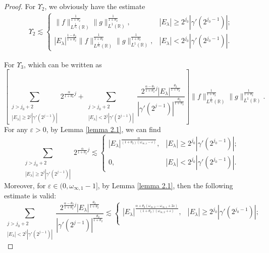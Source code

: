\documentclass[11pt, twoside, leqno]{article}
\theoremstyle{definition}
\numberwithin{equation}{section}
\begin{document}
\begin{proof}
For $\Upsilon_2$, we obviously have the estimate
\begin{align}\label{eq:5.4}
\Upsilon_{2}\lesssim
\begin{cases}
   \|f\|^{\frac{1}{1+\theta_2}}_{L^{\frac{1}{\theta_2}}(\mathbb{R})}\|g\|^{\frac{1}{1+\theta_2}}_{L^{1}(\mathbb{R})}, &  |E_{\lambda}|\geq2^{j_0}|\gamma'(2^{j_{0}-1})|; \\
  |E_\lambda|^{\frac{1-\theta_{2}}{1+\theta_{2}}}\|f\|^{\frac{1}{1+\theta_2}}_{L^{\frac{1}{\theta_2}}(\mathbb{R})}\|g\|^{\frac{1}{1+\theta_2}}_{L^{1}(\mathbb{R})}, & |E_{\lambda}|<2^{j_0}|\gamma'(2^{j_{0}-1})|.
 \end{cases}
  \end{align}

For $\Upsilon_3$, which can be written as
$$\left[\sum\limits_{  \substack{j>j_{0}+2   \\ |E_{\lambda}|\geq2^j{|\gamma'(2^{j-1})|} }} 2^{{\frac{\alpha}{1+\theta_{2}}}j}+
\sum\limits_{  \substack{j>j_{0}+2   \\ |E_{\lambda}|<2^j{|\gamma'(2^{j-1})|} }} \frac{2^{{\frac{\alpha-\theta_{2}}{1+\theta_{2}}}j}
|E_\lambda|^{\frac{\theta_{2}}{1+\theta_{2}}}}{|\gamma'(2^{j-1})|^{\frac{\theta_{2}}{1+\theta_{2}}}}\right]
\|f\|^{\frac{1}{1+\theta_2}}_{L^{\frac{1}{\theta_2}}(\mathbb{R})}\|g\|^{\frac{1}{1+\theta_2}}_{L^{1}(\mathbb{R})}.$$
For any $\varepsilon>0$, by Lemma \ref{lemma 2.1}, we can find
$$\sum\limits_{  \substack{j>j_{0}+2   \\ |E_{\lambda}|\geq2^j{|\gamma'(2^{j-1})|} }} 2^{{\frac{\alpha}{1+\theta_{2}}}j}\lesssim
\begin{cases}
  |E_\lambda|^{\frac{\alpha}{(1+\theta_{2})(\omega_{\infty,1}-\varepsilon)}}, & |E_\lambda|\geq2^{j_0}|\gamma'(2^{j_{0}-1})|;\\
  0, & |E_\lambda|<2^{j_0}|\gamma'(2^{j_{0}-1})|.
\end{cases}$$
Moreover, for $\varepsilon\in(0, \omega_{\infty,1}-1]$, by Lemma \ref{lemma 2.1}, then the following estimate is valid:
$$\sum\limits_{  \substack{j>j_{0}+2   \\ |E_{\lambda}|<2^j{|\gamma'(2^{j-1})|} }} \frac{2^{{\frac{\alpha-\theta_{2}}{1+\theta_{2}}}j}
|E_\lambda|^{\frac{\theta_{2}}{1+\theta_{2}}}}{|\gamma'(2^{j-1})|^{\frac{\theta_{2}}{1+\theta_{2}}}}\lesssim
\begin{cases}
  |E_\lambda|^{\frac{\alpha+\theta_2(\omega_{\infty,2}-\omega_{\infty,1}+2\varepsilon)}{(1+\theta_{2})(\omega_{\infty,2}+\varepsilon)}}, & |E_\lambda|\geq2^{j_0}|\gamma'(2^{j_{0}-1})|; \\

\end{cases}$$
\end{proof}
\end{document}
